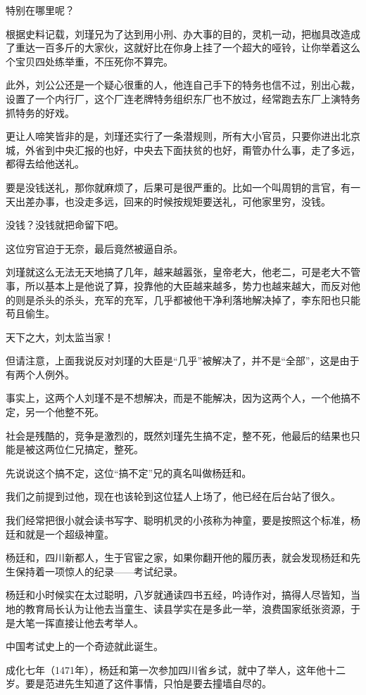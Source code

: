 \begin{multicols}{\theparacolNo}
特别在哪里呢？

根据史料记载，刘瑾兄为了达到用小刑、办大事的目的，灵机一动，把枷具改造成了重达一百多斤的大家伙，这就好比在你身上挂了一个超大的哑铃，让你举着这么个宝贝四处练举重，不压死你不算完。

此外，刘公公还是一个疑心很重的人，他连自己手下的特务也信不过，别出心裁，设置了一个内行厂，这个厂连老牌特务组织东厂也不放过，经常跑去东厂上演特务抓特务的好戏。

更让人啼笑皆非的是，刘瑾还实行了一条潜规则，所有大小官员，只要你进出北京城，外省到中央汇报的也好，中央去下面扶贫的也好，甭管办什么事，走了多远，都得去给他送礼。

要是没钱送礼，那你就麻烦了，后果可是很严重的。比如一个叫周钥的言官，有一天出差办事，也没走多远，回来的时候按规矩要送礼，可他家里穷，没钱。

没钱？没钱就把命留下吧。

这位穷官迫于无奈，最后竟然被逼自杀。

刘瑾就这么无法无天地搞了几年，越来越嚣张，皇帝老大，他老二，可是老大不管事，所以基本上是他说了算，投靠他的大臣越来越多，势力也越来越大，而反对他的则是杀头的杀头，充军的充军，几乎都被他干净利落地解决掉了，李东阳也只能苟且偷生。

天下之大，刘太监当家！

但请注意，上面我说反对刘瑾的大臣是“几乎”被解决了，并不是“全部”，这是由于有两个人例外。

事实上，这两个人刘瑾不是不想解决，而是不能解决，因为这两个人，一个他搞不定，另一个他整不死。

社会是残酷的，竞争是激烈的，既然刘瑾先生搞不定，整不死，他最后的结果也只能是被这两位仁兄搞定，整死。

先说说这个搞不定，这位“搞不定”兄的真名叫做杨廷和。

我们之前提到过他，现在也该轮到这位猛人上场了，他已经在后台站了很久。

我们经常把很小就会读书写字、聪明机灵的小孩称为神童，要是按照这个标准，杨廷和就是一个超级神童。

杨廷和，四川新都人，生于官宦之家，如果你翻开他的履历表，就会发现杨廷和先生保持着一项惊人的纪录——考试纪录。

杨廷和小时候实在太过聪明，八岁就通读四书五经，吟诗作对，搞得人尽皆知，当地的教育局长认为让他去当童生、读县学实在是多此一举，浪费国家纸张资源，于是大笔一挥直接让他去考举人。

中国考试史上的一个奇迹就此诞生。

成化七年（1471年），杨廷和第一次参加四川省乡试，就中了举人，这年他十二岁。要是范进先生知道了这件事情，只怕是要去撞墙自尽的。


\end{multicols}
